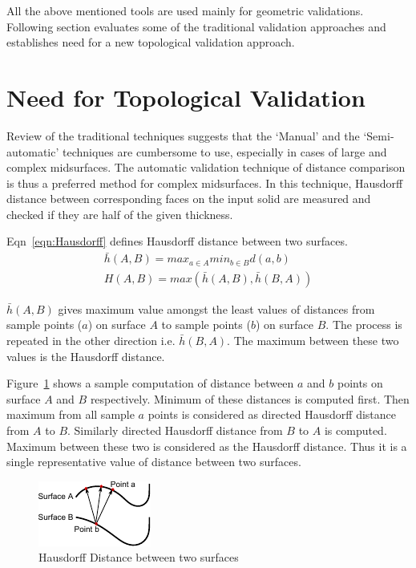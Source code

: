 All the above mentioned tools are used mainly for geometric validations. Following section evaluates some of the traditional validation approaches and establishes need for a new topological validation approach.

\section{Need for Topological Validation}\label{sec:topoval:need}

Review of the traditional techniques suggests that the `Manual' and the `Semi-automatic' techniques are cumbersome to use, especially in cases of large and complex midsurfaces. The automatic validation technique of distance comparison is thus a preferred method for complex midsurfaces. In this technique, Hausdorff distance between corresponding faces on the input solid are measured and checked if they are half of the given thickness. 

Eqn~\ref{eqn:Hausdorff} defines Hausdorff distance between two surfaces.%
\begin{equation*}\label{eqn:Hausdorff}  
\begin{aligned}
\bar{h}(A,B) = max_{a \in A} min_{b \in B} d(a,b) \\
H(A,B) = max (\bar{h}(A,B),\bar{h}(B,A))
\end{aligned}
\end{equation*}

$\bar{h}(A,B)$ gives maximum value amongst the least values of distances from sample points ($a$) on surface $A$ to sample points ($b$) on surface $B$. The process is repeated in the other direction i.e. $\bar{h}(B,A)$. The maximum between these two values is the Hausdorff distance.

Figure~\ref{fig:litsurvey:housdorff} shows a sample computation of distance between $a$ and $b$ points on surface $A$ and $B$ respectively. Minimum of these distances is computed first. Then maximum from all sample $a$ points is considered as directed Hausdorff distance from $A$ to $B$. Similarly directed Hausdorff distance from $B$ to $A$ is computed. Maximum between these two is considered as the Hausdorff distance. Thus it is a single representative value of distance between two surfaces.


\begin{figure}[!h]
\centering     %
\includegraphics[width=0.35\linewidth,valign=t]{images/hausdorff.pdf}
\caption{Hausdorff Distance between two surfaces}
\label{fig:litsurvey:housdorff}
\end{figure}

